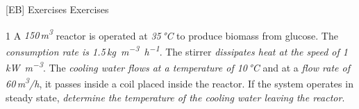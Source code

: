 \documentclass[\mainfilename]{subfiles}
\begin{document}

[EB]
{Exercises} %
{Exercises} %

\begin{questionBox}1{ %
    A \emph{150\,\unit{\metre^3}} reactor is operated at \emph{35\,\unit{\celsius}} to produce biomass from glucose. The \emph{ consumption rate is 1.5\,\unit{\kilo\gram.\metre^{-3}.\hour^{-1}}}. The stirrer \emph{dissipates heat at the speed of 1\,\unit{\kilo\watt.\metre^{-3}}}. The \emph{cooling water flows at a temperature of 10\,\unit{\celsius}} and at a \emph{flow rate of 60\,\unit{\metre^3/\hour}}, it passes inside a coil placed inside the reactor. If the system operates in steady state, \emph{determine the temperature of the cooling water leaving the reactor}.
} %

\end{questionBox}
\end{document}
